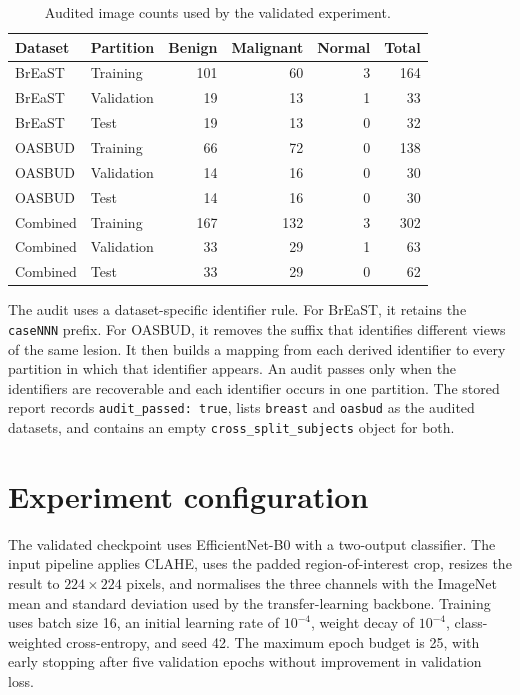 \begin{table}[H]
\centering
\caption{Audited image counts used by the validated experiment.}
\label{tab:appendix_audit_counts}
\small
\begin{tabular}{@{}llrrrr@{}}
\toprule
\textbf{Dataset} & \textbf{Partition} & \textbf{Benign} & \textbf{Malignant} & \textbf{Normal} & \textbf{Total} \\
\midrule
BrEaST & Training & 101 & 60 & 3 & 164 \\
BrEaST & Validation & 19 & 13 & 1 & 33 \\
BrEaST & Test & 19 & 13 & 0 & 32 \\
OASBUD & Training & 66 & 72 & 0 & 138 \\
OASBUD & Validation & 14 & 16 & 0 & 30 \\
OASBUD & Test & 14 & 16 & 0 & 30 \\
\midrule
Combined & Training & 167 & 132 & 3 & 302 \\
Combined & Validation & 33 & 29 & 1 & 63 \\
Combined & Test & 33 & 29 & 0 & 62 \\
\bottomrule
\end{tabular}
\end{table}

The audit uses a dataset-specific identifier rule. For BrEaST, it retains the \texttt{caseNNN} prefix. For OASBUD, it removes the suffix that identifies different views of the same lesion. It then builds a mapping from each derived identifier to every partition in which that identifier appears. An audit passes only when the identifiers are recoverable and each identifier occurs in one partition. The stored report records \texttt{audit\_passed: true}, lists \texttt{breast} and \texttt{oasbud} as the audited datasets, and contains an empty \texttt{cross\_split\_subjects} object for both.

\section{Experiment configuration}

The validated checkpoint uses EfficientNet-B0 with a two-output classifier. The input pipeline applies CLAHE, uses the padded region-of-interest crop, resizes the result to $224\times224$ pixels, and normalises the three channels with the ImageNet mean and standard deviation used by the transfer-learning backbone. Training uses batch size 16, an initial learning rate of $10^{-4}$, weight decay of $10^{-4}$, class-weighted cross-entropy, and seed 42. The maximum epoch budget is 25, with early stopping after five validation epochs without improvement in validation loss.

